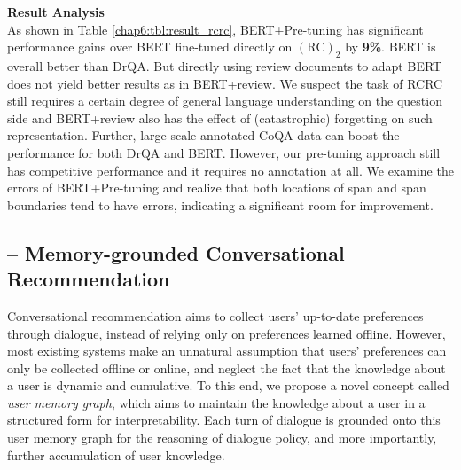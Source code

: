 \begin{table}[H]
    \caption{RCRC on EM (Exact Match) and F1.}
    \centering
\label{chap6:tbl:result_rcrc}
\vspace{-7mm}
\end{table}

\textbf{Result Analysis}\\
As shown in Table \ref{chap6:tbl:result_rcrc}, 
BERT+Pre-tuning has significant performance gains over BERT fine-tuned directly on $(\text{RC})_2$ by \textbf{9\%}.
BERT is overall better than DrQA.
But directly using review documents to adapt BERT does not yield better results as in BERT+review.
We suspect the task of RCRC still requires a certain degree of general language understanding on the question side and BERT+review also has the effect of (catastrophic) forgetting \cite{kirkpatrick2017overcoming} on such representation.
Further, large-scale annotated CoQA data can boost the performance for both DrQA and BERT.
However, our pre-tuning approach still has competitive performance and it requires no annotation at all.
We examine the errors of BERT+Pre-tuning and realize that both locations of span and span boundaries tend to have errors, indicating a significant room for improvement.

\subsection{-- Memory-grounded Conversational Recommendation}

Conversational recommendation aims to collect users' up-to-date preferences through dialogue, instead of relying only on preferences learned offline.
However, most existing systems make an unnatural assumption that users' preferences can only be collected offline or online, and neglect the fact that the knowledge about a user is dynamic and cumulative.
To this end, we propose a novel concept called \textit{user memory graph}, which aims to maintain the knowledge about a user in a structured form for interpretability.
Each turn of dialogue is grounded onto this user memory graph for the reasoning of dialogue policy, and more importantly, further accumulation of user knowledge.

